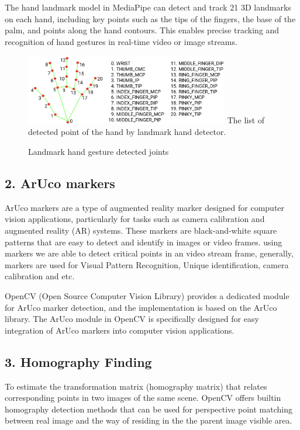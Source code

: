 \documentclass[journal]{IEEEtran}
\begin{document}
The hand landmark model in MediaPipe can detect and track 21 3D landmarks on each hand, including key points such as the tips 
of the fingers, the base of the palm, and points along the hand contours. This enables precise tracking and recognition of hand 
gestures in real-time video or image streams.

\begin{figure}[!t]
  \centering
  \includegraphics[width=3.5in]{photo/hand-landmarks.png}
  The list of detected point of the hand by landmark hand detector.
  \caption{Landmark hand gesture detected joints}
  \label{fig_sim}
\end{figure}

\subsection*{2. ArUco markers}

ArUco markers are a type of augmented reality marker designed for computer vision applications, particularly for tasks such as 
camera calibration and augmented reality (AR) systems. These markers are black-and-white square patterns that are easy to detect 
and identify in images or video frames. using markers we are able to detect critical points in an video stream frame, generally, 
markers are used for Visual Pattern Recognition, Unique identification, camera calibration and etc. 

OpenCV (Open Source Computer Vision Library) provides a dedicated module for ArUco marker detection, and the implementation is 
based on the ArUco library. The ArUco module in OpenCV is specifically designed for easy integration of ArUco markers into 
computer vision applications.

\subsection*{3. Homography Finding}

To estimate the transformation matrix (homography matrix) that relates corresponding points in two images of the same scene. OpenCV
offers builtin homography detection methods that can be used for perspective point matching between real image and the way of residing 
in the the parent image visible area.
\end{document}
